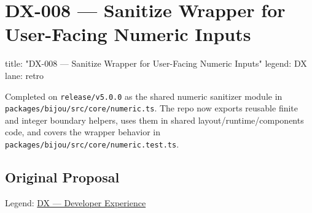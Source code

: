 \chapter{DX-008 --- Sanitize Wrapper for User-Facing Numeric Inputs}\label{record-313}

\smallskip

\begin{RecordMeta}
title: "DX-008 — Sanitize Wrapper for User-Facing Numeric Inputs"
legend: DX
lane: retro

\end{RecordMeta}

Completed on \texttt{r\allowbreak{}e\allowbreak{}l\allowbreak{}e\allowbreak{}a\allowbreak{}s\allowbreak{}e\allowbreak{}/\allowbreak{}v\allowbreak{}5\allowbreak{}.\allowbreak{}0\allowbreak{}.\allowbreak{}0} as the shared numeric sanitizer module in \texttt{p\allowbreak{}a\allowbreak{}c\allowbreak{}k\allowbreak{}a\allowbreak{}g\allowbreak{}e\allowbreak{}s\allowbreak{}/\allowbreak{}b\allowbreak{}i\allowbreak{}j\allowbreak{}o\allowbreak{}u\allowbreak{}/\allowbreak{}s\allowbreak{}r\allowbreak{}c\allowbreak{}/\allowbreak{}c\allowbreak{}o\allowbreak{}r\allowbreak{}e\allowbreak{}/\allowbreak{}n\allowbreak{}u\allowbreak{}m\allowbreak{}e\allowbreak{}r\allowbreak{}i\allowbreak{}c\allowbreak{}.\allowbreak{}t\allowbreak{}s}. The repo now exports reusable finite and integer boundary helpers, uses them in shared layout/runtime/components code, and covers the wrapper behavior in \texttt{p\allowbreak{}a\allowbreak{}c\allowbreak{}k\allowbreak{}a\allowbreak{}g\allowbreak{}e\allowbreak{}s\allowbreak{}/\allowbreak{}b\allowbreak{}i\allowbreak{}j\allowbreak{}o\allowbreak{}u\allowbreak{}/\allowbreak{}s\allowbreak{}r\allowbreak{}c\allowbreak{}/\allowbreak{}c\allowbreak{}o\allowbreak{}r\allowbreak{}e\allowbreak{}/\allowbreak{}n\allowbreak{}u\allowbreak{}m\allowbreak{}e\allowbreak{}r\allowbreak{}i\allowbreak{}c\allowbreak{}.\allowbreak{}t\allowbreak{}e\allowbreak{}s\allowbreak{}t\allowbreak{}.\allowbreak{}t\allowbreak{}s}.

\section{Original Proposal}\label{record-313-original-proposal}

Legend: \href{https://github.com/flyingrobots/bijou/blob/1853ad902f6bf219326409e7f743a5a1d6517dbc/docs/method/legends/DX-developer-experience.md}{DX --- Developer Experience}

